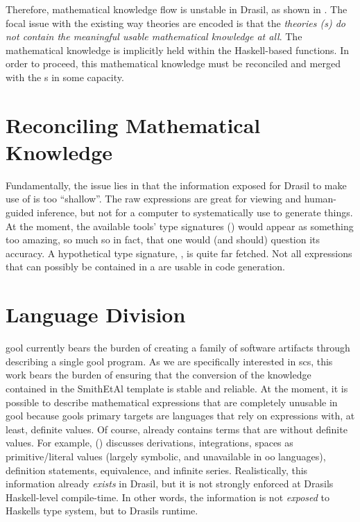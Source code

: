 Therefore, mathematical knowledge flow is unstable in Drasil, as shown in
. The focal issue with the existing way theories
are encoded is that the \textit{theories (\RelationConcept{}s) do not contain
	the meaningful usable mathematical knowledge at all}. The mathematical knowledge
is implicitly held within the Haskell-based functions. In order to proceed, this mathematical knowledge
must be reconciled and merged with the \RelationConcept{}s in some capacity.

\theoriesWithoutModelKinds{}

\section{Reconciling Mathematical Knowledge}

Fundamentally, the issue lies in that the information exposed for Drasil to make
use of is too ``shallow''. The raw expressions are great for viewing and
human-guided inference, but not for a computer to systematically use to generate
things. At the moment, the available tools' type signatures () would appear as something too amazing, so much so in fact, that one
would (and should) question its accuracy. A hypothetical type signature,
, is quite far fetched. Not all expressions
that can possibly be contained in a \RelationConcept{} are usable in code
generation.

\section{Language Division}

\acs{gool} currently bears the burden of creating a family of software artifacts
through describing a single \acs{gool} program. As we are specifically
interested in \acs{scs}, this work bears the burden of ensuring that the
conversion of the knowledge contained in the SmithEtAl template
\cite{SmithAndLai2005} is stable and reliable. At the moment, it is possible to
describe mathematical expressions that are completely unusable in \acs{gool}
because \acsp{gool} primary targets are languages that rely on expressions with,
at least, definite values. Of course, \Expr{} already contains terms that are
without definite values. For example, \Expr{} ()
discusses derivations, integrations, spaces as primitive/literal values (largely
symbolic, and unavailable in \acs{oo} languages), definition statements,
equivalence, and infinite series. Realistically, this
information already \textit{exists} in Drasil, but it is not strongly enforced
at Drasils Haskell-level compile-time. In other words, the information is not
\textit{exposed} to Haskells type system, but to Drasils runtime.

